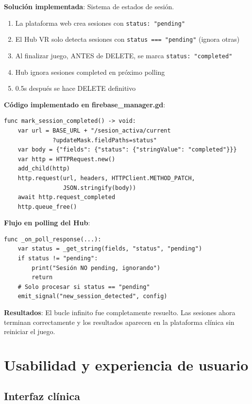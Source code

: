 \textbf{Solución implementada}: Sistema de estados de sesión.

\begin{enumerate}
    \item La plataforma web crea sesiones con \texttt{status: "pending"}
    \item El Hub VR solo detecta sesiones con \texttt{status === "pending"} (ignora otras)
    \item Al finalizar juego, ANTES de DELETE, se marca \texttt{status: "completed"}
    \item Hub ignora sesiones completed en próximo polling
    \item 0.5s después se hace DELETE definitivo
\end{enumerate}

\textbf{Código implementado en firebase\_manager.gd}:

\begin{verbatim}
func mark_session_completed() -> void:
    var url = BASE_URL + "/sesion_activa/current
              ?updateMask.fieldPaths=status"
    var body = {"fields": {"status": {"stringValue": "completed"}}}
    var http = HTTPRequest.new()
    add_child(http)
    http.request(url, headers, HTTPClient.METHOD_PATCH, 
                 JSON.stringify(body))
    await http.request_completed
    http.queue_free()
\end{verbatim}

\textbf{Flujo en polling del Hub}:

\begin{verbatim}
func _on_poll_response(...):
    var status = _get_string(fields, "status", "pending")
    if status != "pending":
        print("Sesión NO pending, ignorando")
        return
    # Solo procesar si status == "pending"
    emit_signal("new_session_detected", config)
\end{verbatim}

\textbf{Resultados}: El bucle infinito fue completamente resuelto. Las sesiones ahora terminan correctamente y los resultados aparecen en la plataforma clínica sin reiniciar el juego.

\section{Usabilidad y experiencia de usuario}

\subsection{Interfaz clínica}

